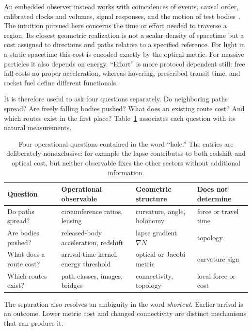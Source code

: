 \documentclass[aps,prd,twocolumn,amsmath,amssymb,nofootinbib]{revtex4-2}
\begin{document}
An embedded observer instead works with coincidences of events, causal order,
calibrated clocks and volumes, signal responses, and the motion of test bodies~\cite{toffoli:79,svozil-94}.
The intuition pursued here concerns the time or effort needed to traverse a
region.  Its closest geometric realization is not a scalar density of
spacetime but a cost assigned to directions and paths relative to a specified
reference.  For light in a static spacetime this cost is encoded exactly by the
optical metric.  For massive particles it also depends on energy.  ``Effort''
is more protocol dependent still: free fall costs no proper acceleration,
whereas hovering, prescribed transit time, and rocket fuel define different
functionals.

It is therefore useful to ask four questions separately.  Do neighboring paths
spread?  Are freely falling bodies pushed?  What does an existing route cost?
And which routes exist in the first place?  Table~\ref{tab:fourquestions}
associates each question with its natural measurements.

\begin{table}[ht]
\centering
\begin{ruledtabular}
\begin{tabular}{llll}
Question & Operational observable & Geometric structure & Does not determine \\
\hline
Do paths spread? & circumference ratios, lensing & curvature, angle, holonomy & force or travel time \\
Are bodies pushed? & released-body acceleration, redshift & lapse gradient $\nabla N$ & topology \\
What does a route cost? & arrival-time kernel, energy threshold & optical or Jacobi metric & curvature sign \\
Which routes exist? & path classes, images, bridges & connectivity, topology & local force or cost
\end{tabular}
\end{ruledtabular}
\caption{Four operational questions contained in the word ``hole.''  The
entries are deliberately nonexclusive: for example the lapse contributes to
both redshift and optical cost, but neither observable fixes the other sectors
without additional information.}
\label{tab:fourquestions}
\end{table}

The separation also resolves an ambiguity in the word \emph{shortcut}.
Earlier arrival is an outcome.  Lower metric cost and changed connectivity are
distinct mechanisms that can produce it.
\end{document}
